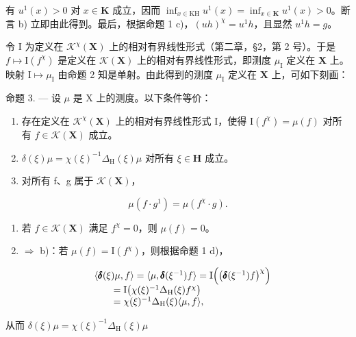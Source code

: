 有 \(u^1(x) > 0\) 对 \(x \in \mathbf{K}\) 成立，因而 \(\inf_{x \in \mathrm{KH}} u^1(x) = \inf_{x \in \mathbf{K}} u^1(x) > 0\)。断言 b) 立即由此得到。最后，根据命题 1 c)，\((uh)^{\chi} = u^{1}h\)，且显然 \(u^1h = g\)。

令 I 为定义在 \(\mathcal{K}^{\chi}(\mathbf{X})\) 上的相对有界线性形式（第二章，§2，第 2 号）。于是 \(f \mapsto \mathrm{I}(f^{\chi})\) 是定义在 \(\mathcal{K}(\mathbf{X})\) 上的相对有界线性形式，即测度 \(\mu_{\mathrm{I}}\) 定义在 \(\mathbf{X}\) 上。映射 \(\mathrm{I} \mapsto \mu_{\mathrm{I}}\) 由命题 2 知是单射。由此得到的测度 \(\mu_{\mathrm{I}}\) 定义在 \(\mathbf{X}\) 上，可如下刻画：

命题 3. --- 设 \(\mu\) 是 X 上的测度。以下条件等价：

\begin{enumerate}
\def\labelenumi{\alph{enumi})}
\item
  存在定义在 \(\mathcal{K}^{\chi}(\mathbf{X})\) 上的相对有界线性形式 I，使得 \(\mathrm{I}(f^{\chi}) = \mu(f)\) 对所有 \(f\in \mathcal{K}(\mathbf{X})\) 成立。
\item
  \(\delta (\xi)\mu = \chi (\xi)^{-1}\Delta_{\mathrm{H}}(\xi)\mu\) 对所有 \(\xi \in \mathbf{H}\) 成立。
\item
  对所有 f、g 属于 \(\mathcal{K}(\mathbf{X})\)，
\end{enumerate}

\[
\mu (f \cdot g ^ {1}) = \mu (f ^ {\chi} \cdot g).\tag{2}
\]

\begin{enumerate}
\def\labelenumi{\alph{enumi})}
\setcounter{enumi}{3}
\item
  若 \(f \in \mathcal{K}(\mathbf{X})\) 满足 \(f^{\chi} = 0\)，则 \(\mu(f) = 0\)。
\item
  \(\Rightarrow\) b)：若 \(\mu(f)=\mathrm{I}(f^{\chi})\)，则根据命题 1 d)，
\end{enumerate}

\[
\begin{array}{r l} & {\langle \pmb {\delta} (\xi) \mu , f \rangle = \langle \mu , \pmb {\delta} (\xi^ {- 1}) f \rangle = \mathrm{I} \Big (\big (\pmb {\delta} (\xi^ {- 1}) f \big) ^ {\chi} \Big)} \\ & {\qquad = \mathrm{I} \big (\chi (\xi) ^ {- 1} \Delta_ {\mathrm{H}} (\xi) f ^ {\chi} \big)} \\ & {\qquad = \chi (\xi) ^ {- 1} \Delta_ {\mathrm{H}} (\xi) \langle \mu , f \rangle ,} \end{array}
\]

从而 \(\delta (\xi)\mu = \chi (\xi)^{-1}\Delta_{\mathrm{H}}(\xi)\mu\)


